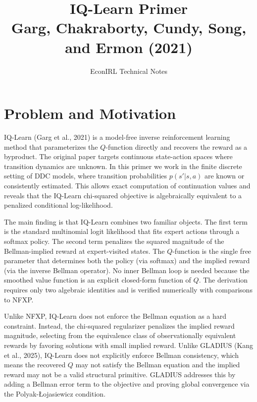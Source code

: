 \documentclass[11pt]{article}
\title{IQ-Learn Primer\\[2pt]
\large Garg, Chakraborty, Cundy, Song, and Ermon (2021)}
\author{EconIRL Technical Notes}
\date{}
\begin{document}
\maketitle
\vspace{-1em}

\section{Problem and Motivation}

IQ-Learn (Garg et al., 2021) is a model-free inverse reinforcement learning method that parameterizes the $Q$-function directly and recovers the reward as a byproduct. The original paper targets continuous state-action spaces where transition dynamics are unknown. In this primer we work in the finite discrete setting of DDC models, where transition probabilities $p(s'|s,a)$ are known or consistently estimated. This allows exact computation of continuation values and reveals that the IQ-Learn chi-squared objective is algebraically equivalent to a penalized conditional log-likelihood.

The main finding is that IQ-Learn combines two familiar objects. The first term is the standard multinomial logit likelihood that fits expert actions through a softmax policy. The second term penalizes the squared magnitude of the Bellman-implied reward at expert-visited states. The $Q$-function is the single free parameter that determines both the policy (via softmax) and the implied reward (via the inverse Bellman operator). No inner Bellman loop is needed because the smoothed value function is an explicit closed-form function of $Q$. The derivation requires only two algebraic identities and is verified numerically with comparisons to NFXP.

Unlike NFXP, IQ-Learn does not enforce the Bellman equation as a hard constraint. Instead, the chi-squared regularizer penalizes the implied reward magnitude, selecting from the equivalence class of observationally equivalent rewards by favoring solutions with small implied reward. Unlike GLADIUS (Kang et al., 2025), IQ-Learn does not explicitly enforce Bellman consistency, which means the recovered $Q$ may not satisfy the Bellman equation and the implied reward may not be a valid structural primitive. GLADIUS addresses this by adding a Bellman error term to the objective and proving global convergence via the Polyak-\L{}ojasiewicz condition.
\end{document}

